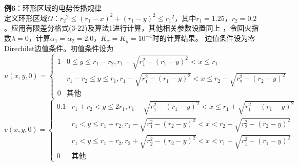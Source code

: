 \documentclass[twoside,UTF8]{nputhesis}
\begin{document}
                                                                                   
\noindent   %
\textbf{例6}：环形区域的电势传播规律\\
定义环形区域$\tilde{\Omega }$：${{r}_{2}}^{2}\le {{({{r}_{1}}-x)}^{2}}+{{({{r}_{1}}-y)}^{2}}\le {{r}_{1}}^{2}$，其中${{r}_{1}}=1.25$，${{r}_{2}}=0.2$。应用有限差分格式(3-22)及算法1进行计算，其他相关参数设置同上 ，令回火指数$\lambda =0$，计算${{\alpha }_{1}} ={{\alpha }_{2}} =2\text{.0}$，${{K}_{x}}={{K}_{y}}={{10}^{-4}}$时的计算结果。
边值条件设为零Direchilet边值条件。初值条件设为\\
\[
u(x, y, 0)=\left\{\begin{array}{ccc}{1} & {0 \leq y \leq r_{1}-r_{2}, r_{1}-\sqrt{r_{1}^{2}-\left(r_{1}-y\right)^{2}}<x \leq r_{1}} \\ {} & {r_{1}-r_{2} \leq y \leq r_{1}, r_{1}-\sqrt{r_{1}^{2}-\left(r_{1}-y\right)^{2}}<x \leq r_{2}-\sqrt{r_{2}^{2}-\left(r_{2}-y\right)^{2}}} \\ {0} & { \text{其他} }\end{array}\right.
\]
\[
v(x, y, 0)=\left\{\begin{array}{ccc}{0.1} &{ r_{1}+r_{2}<y \leq 2 r_{1}, r_{1}-\sqrt{r_{1}^{2}-\left(r_{1}-y\right)^{2}}<x \leq r_{1}+\sqrt{r_{1}^{2}-\left(r_{1}-y\right)^{2}}} \\ &{r_{1}<y \leq r_{1}+r_{2}, r_{1}-\sqrt{r_{1}^{2}-\left(r_{2}-y\right)^{2}}<x<r_{2}-\sqrt{r_{2}^{2}-\left(r_{2}-y\right)^{2}}} \\ &{r_{1}<y \leq r_{1}+r_{2}, r_{2}+\sqrt{r_{2}^{2}-\left(r_{2}-y\right)^{2}}<x<r_{1}+\sqrt{r_{1}^{2}-\left(r_{1}-y\right)^{2}}} \\
{0}  &{\text{其他}}\end{array}\right.
\]
\end{document}
